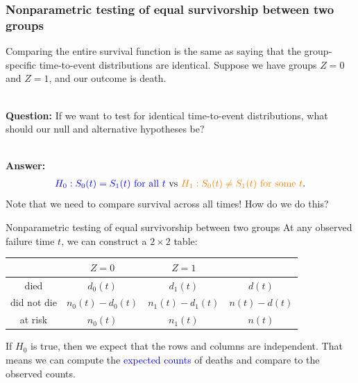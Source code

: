 \documentclass[10pt,t]{beamer}
\begin{document}
\begin{frame}
\frametitle{Nonparametric testing of equal survivorship between two groups}

Comparing the entire survival function is the same as saying that the group-specific time-to-event distributions are identical. Suppose we have groups $Z = 0$ and $Z = 1$, and our outcome is death.
\\ ~\ 

\textbf{Question:} If we want to test for identical time-to-event distributions, what should our null and alternative hypotheses be? \pause 
\\ ~\ 

\textbf{Answer:}
\begin{align*}
\textcolor{blue}{H_0: S_0(t) = S_1(t) \text{ for all } t} \ \text{vs} \ \textcolor{orange}{H_1: S_0(t) \neq S_1(t) \text{ for some }t}.
\end{align*} \pause 
Note that we need to compare survival across all times! How do we do this? 
\end{frame}

\begin{frame}{Nonparametric testing of equal survivorship between two groups}
At any observed failure time $t$, we can construct a $2 \times 2$ table:\vspace{-0.2cm}

\begin{center}
	\begin{tabular}{c|c|c|c}
		& $Z = 0$ & $Z = 1$ \\
		\hline
		died & $d_0(t)$ & $d_1(t)$ & $d(t)$ \\
		did not die & $n_0(t) - d_0(t)$ & $n_1(t) - d_1(t)$ & $n(t) - d(t)$\\
		at risk & $n_0(t)$ & $n_1(t)$ & $n(t)$
	\end{tabular}
\end{center}\vspace{-0.2cm}

If $H_0$ is true, then we expect that the rows and columns are independent. That means we can compute the \textcolor{blue}{expected counts} of deaths and compare to the observed counts.
\end{frame}
\end{document}
